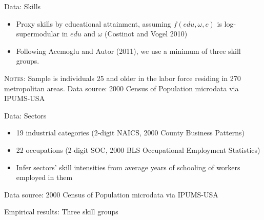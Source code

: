 \documentclass[10pt,notes=hide]{beamer}
\begin{document}
\begin{frame}{Data: Skills}
\begin{itemize}
\item Proxy skills by educational attainment, assuming $f(edu,\omega,c)$
is log-supermodular in $edu$ and $\omega$ (Costinot and Vogel 2010)
\item Following Acemoglu and Autor (2011), we use a minimum of three skill
groups.
\end{itemize}
\resizebox{\textwidth}{!}{}
\begin{minipage}{.9\textwidth}\begin{center}
\scriptsize{\flushleft \textsc{Notes}: Sample is individuals 25 and older in the labor force residing in 270 metropolitan areas. Data source: 2000 Census of Population microdata via IPUMS-USA\par}
\end{center}\end{minipage}
\end{frame}
\begin{frame}{Data: Sectors}
\begin{itemize}
\item 19 industrial categories {\scriptsize{} (2-digit NAICS, 2000 County
Business Patterns) }{\scriptsize \par}
\item 22 occupations{\scriptsize{} (2-digit SOC, 2000 BLS Occupational Employment
Statistics)}{\scriptsize \par}
\item Infer sectors' skill intensities from average years of schooling of
workers employed in them
\end{itemize}
\resizebox{\textwidth}{!}{}
\begin{minipage}{.9\textwidth}\begin{center}
\scriptsize{Data source: 2000 Census of Population microdata via IPUMS-USA\par}
\end{center}\end{minipage}
\end{frame}
\begin{frame}{Empirical results: Three skill groups}
\begin{table}
\begin{centering}
\resizebox{\textwidth}{!}{}
\par\end{centering}
\end{table}
\end{frame}
\end{document}
